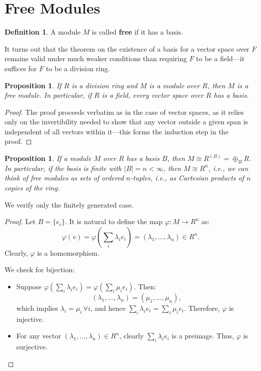 \documentclass{article}
\newif\ifusemulticols
\newcommand\newterm[1]{\textbf{#1}}
\theoremstyle{definition}
\newtheorem{deff}{Definition}
\theoremstyle{remark}
\theoremstyle{plain}
\theoremstyle{plain}
\newtheorem{prop}[theorem]{Proposition}
\newenvironment{mymulticols}
    { \ifusemulticols \begin{multicols}{2} \fi }
    { \ifusemulticols \end{multicols} \fi }
\begin{document}
\begin{mymulticols}
\section{Free Modules}%
\label{sec:free_modules}

\begin{deff}
    A module $M$ is called \newterm{free} if it has a basis.
\end{deff}

It turns out that the theorem on the existence of a basis for a vector space over $F$ remains valid
under much weaker conditions than requiring $F$ to be a field—it suffices for $F$ to be a division
ring.
\begin{prop}
    If $R$ is a division ring and $M$ is a module over $R$, then $M$ is a free module.
    In particular, if $R$ is a field, every vector space over $R$ has a basis.
\end{prop}
\begin{proof}
    The proof proceeds verbatim as in the case of vector spaces, as it relies only on the
    invertibility needed to show that any vector outside a given span is independent of all vectors
    within it—this forms the induction step in the proof.
\end{proof}

\begin{prop}
    \label{prop:free_form}
    If a module $M$ over $R$ has a basis $B$, then $M \cong R^{(B)} = \oplus_B R$.
    In particular, if the basis is finite with $|B| = n < \infty$, then $M \cong R^n$, i.e., we can
    think of free modules as sets of ordered $n$-tuples, i.e., as Cartesian products of $n$ copies
    of the ring.
\end{prop}
We verify only the finitely generated case.
\begin{proof}
    Let $B = \{e_i\}$. It is natural to define the map ${\varphi : M \to R^n}$ as:
    $$\varphi(v) = \varphi\left(\sum_i \lambda_i e_i\right) = \left( \lambda_1, \ldots, \lambda_n \right) \in R^n.$$
    Clearly, $\varphi$ is a homomorphism.

    We check for bijection:
    \begin{itemize}
        \item Suppose $\varphi\left(\sum_i \lambda_i e_i\right) = \varphi\left(\sum_i \mu_i e_i\right)$. 
          Then: $$\left(\lambda_1, \ldots, \lambda_n\right) = \left(\mu_1, \ldots,
          \mu_n\right),$$ which implies $\lambda_i = \mu_i \, \forall i$, and hence $\sum_i
          \lambda_i e_i = \sum_i \mu_i e_i$. Therefore, $\varphi$ is injective.
        \item For any vector $\left(\lambda_1, \ldots, \lambda_n\right) \in R^n$, clearly $\sum_i
          \lambda_i e_i$ is a preimage. Thus, $\varphi$ is surjective.
    \end{itemize}


\end{proof}
\end{mymulticols}
\end{document}

